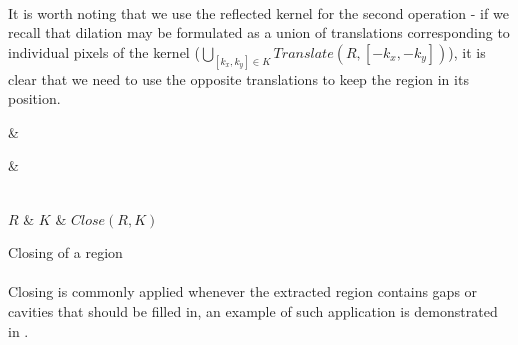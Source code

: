 \paragraph*{}
It is worth noting that we use the reflected kernel for the second operation - if we recall that dilation may be formulated as a union of translations corresponding to individual pixels of the kernel ($\bigcup_{[k_x, k_y] \in K} Translate(R, [-k_x, -k_y])$), it is clear that we need to use the opposite translations to keep the region in its position.

\newarray\closingInput
{}

\newarray\closingKernel
{}

\newarray\closingResult
{}

\begin{table}[h]
\centering
{}

 &
 &

\\

$R$ &
$K$ &
$Close(R,K)$

\endtabular
\caption{Closing of a region}
\label{tab:RegionClosing}
\end{table}

\paragraph*{}
Closing is commonly applied whenever the extracted region contains gaps or cavities that should be filled in, an example of such application is demonstrated in .

